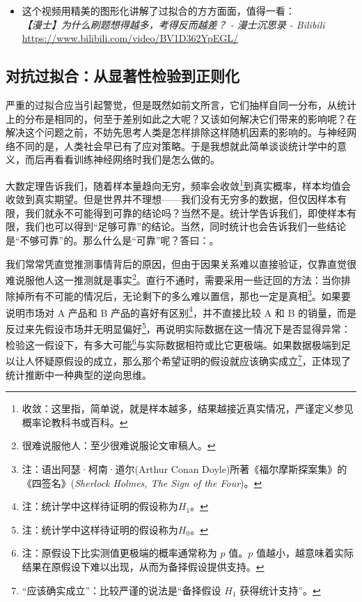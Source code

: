 \begin{tcolorbox}[myrecommendbox, title=推荐阅读, breakable=false]
    \begin{itemize}
        \item 这个视频用精美的图形化讲解了过拟合的方方面面，值得一看：\\
              \textit{【漫士】为什么刷题想得越多，考得反而越差？ - 漫士沉思录 - Bilibili}\\
              \url{https://www.bilibili.com/video/BV1D362YpEGL/}
    \end{itemize}
\end{tcolorbox}

\newpage

\subsection{对抗过拟合：从显著性检验到正则化}

严重的过拟合应当引起警觉，但是既然如前文所言，它们抽样自同一分布，从统计上的分布是相同的，何至于差别如此之大呢？又该如何解决它们带来的影响呢？在解决这个问题之前，不妨先思考人类是怎样排除这样随机因素的影响的。与神经网络不同的是，人类社会早已有了应对策略。于是我想就此简单谈谈统计学中的意义，而后再看看训练神经网络时我们是怎么做的。

大数定理告诉我们，随着样本量趋向无穷，频率会收敛\footnote{收敛：这里指，简单说，就是样本越多，结果越接近真实情况，严谨定义参见概率论教科书或百科。}到真实概率，样本均值会收敛到真实期望。但是世界并不理想——我们没有无穷多的数据，但仅因样本有限，我们就永不可能得到可靠的结论吗？当然不是。统计学告诉我们，即使样本有限，我们也可以得到“足够可靠”的结论。当然，同时统计也会告诉我们一些结论是“不够可靠”的。那么什么是“可靠”呢？答曰：。

我们常常凭直觉推测事情背后的原因，但由于因果关系难以直接验证，仅靠直觉很难说服他人这一推测就是事实\footnote{很难说服他人：至少很难说服论文审稿人。}。直行不通时，需要采用一些迂回的方法：当你排除掉所有不可能的情况后，无论剩下的多么难以置信，那也一定是真相\footnote{注：语出阿瑟·柯南·道尔(Arthur Conan Doyle)所著《福尔摩斯探案集》的《四签名》(\emph{Sherlock Holmes, The Sign of the Four})。}。如果要说明市场对 A 产品和 B 产品的喜好有区别\footnote{注：统计学中这样待证明的假设称为$H_1$。}，并不直接比较 A 和 B 的销量，而是反过来先假设市场并无明显偏好\footnote{注：统计学中这样待证明的假设称为$H_0$。}，再说明实际数据在这一情况下是否显得异常：检验这一假设下，有多大可能\footnote{注：原假设下比实测值更极端的概率通常称为 $p$ 值。$p$ 值越小，越意味着实际结果在原假设下难以出现，从而为备择假设提供支持。}与实际数据相符或比它更极端。如果数据极端到足以让人怀疑原假设的成立，那么那个希望证明的假设就应该确实成立\footnote{“应该确实成立”：比较严谨的说法是“备择假设 $H_1$ 获得统计支持”。}，正体现了统计推断中一种典型的逆向思维。

